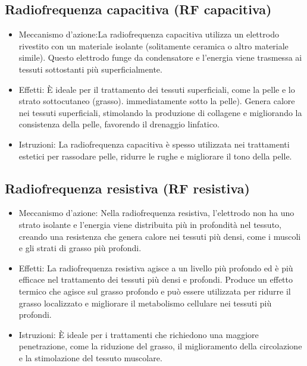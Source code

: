 \documentclass[a4paper]{article}
\begin{document}
\subsection{Radiofrequenza capacitiva (RF capacitiva)}
\begin{itemize}
  \item Meccanismo d'azione:La radiofrequenza capacitiva utilizza un elettrodo rivestito con un materiale isolante (solitamente ceramica o altro materiale simile). Questo elettrodo funge da condensatore e l'energia viene trasmessa ai tessuti sottostanti più superficialmente.
  \item Effetti: È ideale per il trattamento dei tessuti superficiali, come la pelle e lo strato sottocutaneo (grasso). immediatamente sotto la pelle). Genera calore nei tessuti superficiali, stimolando la produzione di collagene e migliorando la consistenza della pelle, favorendo il drenaggio linfatico.
  \item Istruzioni: La radiofrequenza capacitiva è spesso utilizzata nei trattamenti estetici per rassodare pelle, ridurre le rughe e migliorare il tono della pelle.
\end{itemize}

\subsection{Radiofrequenza resistiva (RF resistiva)}
\begin{itemize}
  \item Meccanismo d'azione: Nella radiofrequenza resistiva, l'elettrodo non ha uno strato isolante e l'energia viene distribuita più in profondità nel tessuto, creando una resistenza che genera calore nei tessuti più densi, come i muscoli e gli strati di grasso più profondi.
  \item Effetti: La radiofrequenza resistiva agisce a un livello più profondo ed è più efficace nel trattamento dei tessuti più densi e profondi. Produce un effetto termico che agisce sul grasso profondo e può essere utilizzata per ridurre il grasso localizzato e migliorare il metabolismo cellulare nei tessuti più profondi.
  \item Istruzioni: È ideale per i trattamenti che richiedono una maggiore penetrazione, come la riduzione del grasso, il miglioramento della circolazione e la stimolazione del tessuto muscolare.
\end{itemize}
\end{document}

